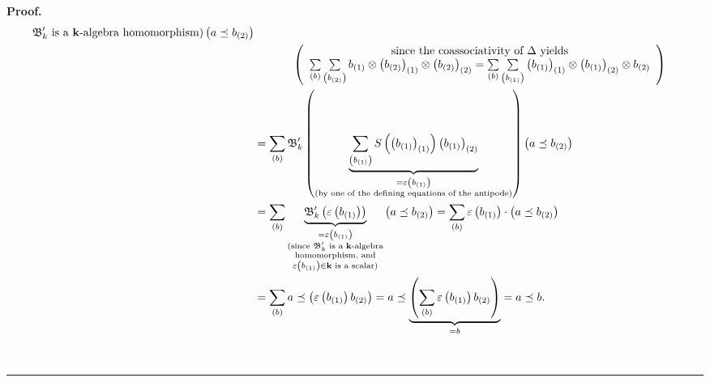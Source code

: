 \documentclass[numbers=enddot,12pt,final,onecolumn,notitlepage,abstracton]{scrartcl}%
\theoremstyle{definition}
\newenvironment{proof}[1][Proof]{\noindent\textbf{#1.} }{\ \rule{0.5em}{0.5em}}
\newenvironment{verlong}{}{}
\let\sumnonlimits\sum
\renewcommand{\sum}{\sumnonlimits\limits}
\begin{document}
\begin{verlong}
\begin{proof}
\begin{align*}
{{\mathfrak{B}_{k}^{\prime}\text{ is a }\mathbf{k}\text{-algebra homomorphism)}%
}}\left(  a\left.  \preceq\right.  b_{\left(  2\right)  }\right) \\
&  \ \ \ \ \ \ \ \ \ \ \left(
\begin{array}
[c]{c}%
\text{since the coassociativity of }\Delta\text{ yields}\\
\sum_{\left(  b\right)  }\sum_{\left(  b_{\left(  2\right)  }\right)
}b_{\left(  1\right)  }\otimes\left(  b_{\left(  2\right)  }\right)  _{\left(
1\right)  }\otimes\left(  b_{\left(  2\right)  }\right)  _{\left(  2\right)
}=\sum_{\left(  b\right)  }\sum_{\left(  b_{\left(  1\right)  }\right)
}\left(  b_{\left(  1\right)  }\right)  _{\left(  1\right)  }\otimes\left(
b_{\left(  1\right)  }\right)  _{\left(  2\right)  }\otimes b_{\left(
2\right)  }%
\end{array}
\right) \\
&  =\sum_{\left(  b\right)  }\mathfrak{B}_{k}^{\prime}\left(  \underbrace{\sum
_{\left(  b_{\left(  1\right)  }\right)  }S\left(  \left(  b_{\left(
1\right)  }\right)  _{\left(  1\right)  }\right)  \left(  b_{\left(  1\right)
}\right)  _{\left(  2\right)  }}_{\substack{=\varepsilon\left(  b_{\left(
1\right)  }\right)  \\\text{(by one of the defining equations of the
antipode)}}}\right)  \left(  a\left.  \preceq\right.  b_{\left(  2\right)
}\right) \\
&  =\sum_{\left(  b\right)  }\underbrace{\mathfrak{B}_{k}^{\prime}\left(
\varepsilon\left(  b_{\left(  1\right)  }\right)  \right)  }%
_{\substack{=\varepsilon\left(  b_{\left(  1\right)  }\right)  \\\text{(since
}\mathfrak{B}_{k}^{\prime}\text{ is a }\mathbf{k}\text{-algebra}%
\\\text{homomorphism, and}\\\varepsilon\left(  b_{\left(  1\right)  }\right)
\in\mathbf{k}\text{ is a scalar)}}}\left(  a\left.  \preceq\right.  b_{\left(
2\right)  }\right)  =\sum_{\left(  b\right)  }\varepsilon\left(  b_{\left(
1\right)  }\right)  \cdot\left(  a\left.  \preceq\right.  b_{\left(  2\right)
}\right) \\
&  =\sum_{\left(  b\right)  }a\left.  \preceq\right.  \left(  \varepsilon
\left(  b_{\left(  1\right)  }\right)  b_{\left(  2\right)  }\right)
=a\left.  \preceq\right.  \underbrace{\left(  \sum_{\left(  b\right)
}\varepsilon\left(  b_{\left(  1\right)  }\right)  b_{\left(  2\right)
}\right)  }_{=b}=a\left.  \preceq\right.  b.
\end{align*}



\end{proof}
\end{verlong}
\end{document}
